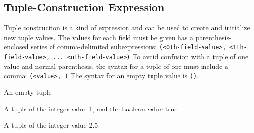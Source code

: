 
\subsection{Tuple-Construction Expression}
{
	Tuple construction is a kind of expression and can be
	used to create and initialize new tuple values.
	The values for each field must be given has a parenthesis-enclosed
	series of comma-delimited
	subexpressions: \texttt{(<0th-field-value>, <1th-field-value>, ... <nth-field-value>)}
	To avoid confusion with a tuple of one value and normal parenthesis, the
	syntax for a tuple of one must include a comma: \texttt{(<value>, )}
	The syntax for an empty tuple value is \texttt{()}.
	
	\begin{itemize}
	{
		\item[\texttt{()}] An empty tuple
		
		\item[\texttt{(1, true)}] A tuple of the integer value 1, and the
			boolean value true.
		
		\item[\texttt{(2.5,)}] A tuple of the integer value 2.5
	}
	\end{itemize}
}
